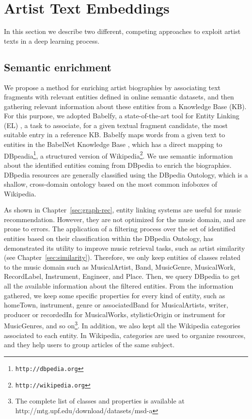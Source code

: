 \section{Artist Text Embeddings}\label{sec:cold-rec:text}

In this section we describe two different, competing approaches to exploit artist texts in a deep learning process. %

\subsection{Semantic enrichment}\label{sec:cold-rec:sem}

We propose a method for enriching artist biographies by associating text fragments with relevant entities defined in online semantic datasets, and then gathering relevant information about these entities from a Knowledge Base (KB). For this purpose, we adopted Babelfy, a state-of-the-art tool for Entity Linking (EL) \cite{Moroetal2014}, a task to associate, for a given textual fragment candidate, the most suitable entry in a reference KB. Babelfy maps words from a given text to entities in the BabelNet Knowledge Base \cite{Navigli2012}, which has a direct mapping to DBpeadia\footnote{\texttt{http://dbpedia.org}}, a structured version of Wikipedia\footnote{\texttt{http://wikipedia.org}}. We use semantic information about the identified entities coming from DBpedia to enrich the biographies. DBpedia resources are generally classified using the DBpedia Ontology, which is a shallow, cross-domain ontology based on the most common infoboxes of Wikipedia. 

As shown in Chapter~\ref{sec:graph-rec}, entity linking systems are useful for music recommendation. However, they are not optimized for the music domain, and are prone to errors. The application of a filtering process over the set of identified entities based on their classification within the DBpedia Ontology, has demonstrated its utility to improve music retrieval tasks, such as artist similarity (see Chapter~\ref{sec:similarity}). Therefore, we only keep entities of classes related to the music domain such as MusicalArtist, Band, MusicGenre, MusicalWork, RecordLabel, Instrument, Engineer, and Place. Then, we query DBpedia to get all the available information about the filtered entities. From the information gathered, we keep some specific properties for every kind of entity, such as homeTown, instrument, genre or associatedBand for MusicalArtists, writer, producer or recordedIn for MusicalWorks, stylisticOrigin or instrument for MusicGenres, and so on\footnote{The complete list of classes and properties is available at http://mtg.upf.edu/download/datasets/msd-a}. In addition, we also kept all the Wikipedia categories associated to each entity. In Wikipedia, categories are used to organize resources, and they help users to group articles of the same subject.

